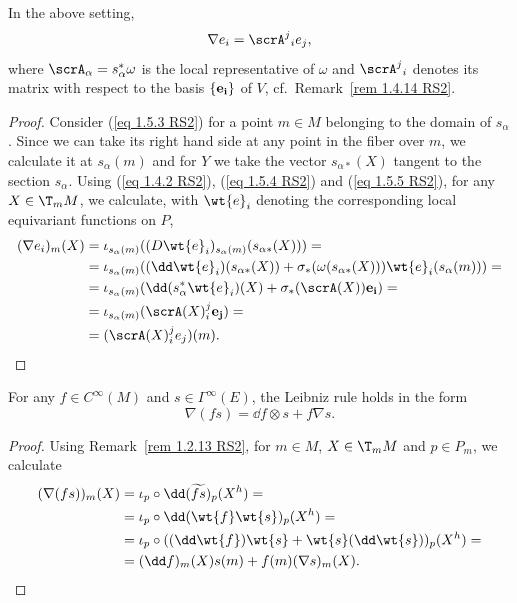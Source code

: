 \begin{prop}[{{\cite[Prop.~1.5.3]{RS2}}}]\label{prop 1.5.3 RS2}
    In the above setting,
    \[\nabla e_i=\scrA^j{}_i e_j,\label{eq 1.5.6 RS2}\]
    where $\scrA_\alpha=s_\alpha^\ast\omega$ is the local representative of $\omega$ and $\scrA^j{}_i$ denotes its matrix with respect to the basis $\{\bf{e}_i\}$ of $V$, cf.\ Remark~\ref{rem 1.4.14 RS2}.
\end{prop}
\begin{proof}
    Consider (\ref{eq 1.5.3 RS2}) for a point $m\in M$ belonging to the domain of $s_\alpha$. Since we can take its right hand side at any point in the fiber over $m$, we calculate it at $s_\alpha(m)$ and for $Y$ we take the vector $s_{\alpha\ast}(X)$ tangent to the section $s_\alpha$. Using (\ref{eq 1.4.2 RS2}), (\ref{eq 1.5.4 RS2}) and (\ref{eq 1.5.5 RS2}), for any $X\in \T_mM$, we calculate, with $\wt{e}_i$ denoting the corresponding local equivariant functions on $P$,
    \begin{align}
        (\nabla e_i)_m(X)&=\iota_{s_\alpha(m)}((D\wt{e}_i)_{s_\alpha(m)}(s_{\alpha\ast}(X)))=\\
        &=\iota_{s_\alpha(m)}((\dd\wt{e}_i)(s_{\alpha\ast}(X))+\sigma_\ast(\omega(s_{\alpha\ast}(X)))\wt{e}_i(s_\alpha(m)))=\\
        &=\iota_{s_\alpha(m)}(\dd(s_\alpha^\ast\wt{e}_i)(X)+\sigma_\ast(\scrA(X))\bf{e}_i)=\\
        &=\iota_{s_\alpha(m)}(\scrA(X)^j_i\bf{e}_j)=\\
        &=(\scrA(X)^j_i e_j)(m).
    \end{align}
\end{proof}

\begin{prop}[{{\cite[Prop.~1.5.4]{RS2}}}]\label{prop 1.5.4 RS2}
    For any $f\in C^\infty(M)$ and $s\in\Gamma^\infty(E)$, the Leibniz rule holds in the form
    \[\nabla(f s)=\dd f\otimes s+f\nabla s.\label{eq 1.5.7 RS2}\]
\end{prop}
\begin{proof}
    Using Remark~\ref{rem 1.2.13 RS2}, for $m\in M$, $X\in \T_mM$ and $p\in P_m$, we calculate
    \begin{align}
        (\nabla(fs))_m(X)&=\iota_p\circ \dd(\widetilde{fs})_p (X^h)=\\
        &=\iota_p\circ \dd(\wt{f}\wt{s})_p(X^h)=\\
        &=\iota_p\circ ((\dd\wt{f})\wt{s}+\wt{s}(\dd\wt{s}))_p(X^h)=\\
        &=(\dd f)_m(X)s(m)+f(m)(\nabla s)_m(X).
    \end{align}
\end{proof}

